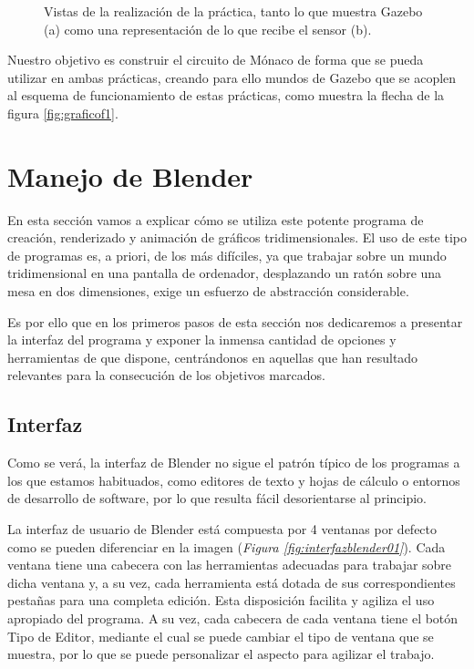 \begin{figure}[h]
	\centering
	\caption[Vistas de la práctica de navegación local del F1]{Vistas de la realización de la práctica, tanto lo que muestra Gazebo (a) como una representación de lo que recibe el sensor (b).} \label{fig:vff}
\end{figure}

Nuestro objetivo es construir el circuito de Mónaco de forma que se pueda utilizar en ambas prácticas, creando para ello mundos de Gazebo que se acoplen al esquema de funcionamiento de estas prácticas, como muestra la flecha de la figura \ref{fig:graficof1}.

\section{Manejo de Blender}
\label{sec:pm_manejodeblender}

En esta sección vamos a explicar cómo se utiliza este potente programa de creación, renderizado y animación de gráficos tridimensionales. El uso de este tipo de programas es, a priori, de los más difíciles, ya que trabajar sobre un mundo tridimensional en una pantalla de ordenador, desplazando un ratón sobre una mesa en dos dimensiones, exige un esfuerzo de abstracción considerable.


Es por ello que en los primeros pasos de esta sección nos dedicaremos a presentar la interfaz del programa y exponer la inmensa cantidad de opciones y herramientas de que dispone, centrándonos en aquellas que han resultado relevantes para la consecución de los objetivos marcados.


\subsection{Interfaz}
\label{subsec:pm_interfaz}

Como se verá, la interfaz de Blender no sigue el patrón típico de los programas a los que estamos habituados, como editores de texto y hojas de cálculo o entornos de desarrollo de software, por lo que resulta fácil desorientarse al principio.

La interfaz de usuario de Blender está compuesta por 4 ventanas por defecto como se pueden diferenciar en la imagen (\textit{Figura \ref{fig:interfazblender01}}). Cada ventana tiene una cabecera con las herramientas adecuadas para trabajar sobre
dicha ventana y, a su vez, cada herramienta está dotada de sus correspondientes pestañas para una completa edición. Esta disposición facilita y agiliza el uso apropiado del programa. A su vez, cada cabecera de cada ventana tiene el botón Tipo de Editor, mediante el cual se puede cambiar el tipo de ventana que se muestra, por lo que se puede personalizar el aspecto para agilizar el trabajo.


